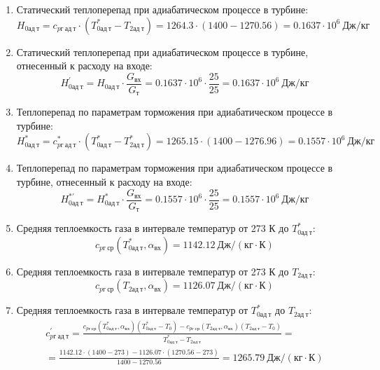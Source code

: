 \documentclass[a4paper,10pt]{article}
\begin{document}
\begin{enumerate}
        \item Статический теплоперепад при адиабатическом процессе в турбине:
        \[
            H_{0ад\ т} = c_{pг\ ад\ т} \cdot \left(
            T_{0ад\ т}^* - T_{2ад\ т}
            \right) =
            1264.3 \cdot \left(
            1400 - 1270.56
            \right) =
            0.1637 \cdot 10^6 \ Дж/кг
        \]

        \item Статический теплоперепад при адиабатическом процессе в турбине, отнесенный к расходу на входе:
        \[
            H_{0ад\ т}^\prime = H_{0ад\ т} \cdot \frac{ G_{вх} }{ G_т }  =
                0.1637 \cdot 10^6 \cdot
                \frac{ 25 }{ 25 } =
            0.1637 \cdot 10^6 \ Дж/кг
        \]

        \item Теплоперепад по параметрам торможения при адиабатическом процессе в турбине:
        \[
            H_{0ад\ т}^* = c_{pг\ ад\ т}^* \cdot \left(
            T_{0ад\ т}^* - T_{2ад\ т}^*
            \right) =
            1265.15 \cdot \left(
            1400 - 1276.96
            \right) =
            0.1557 \cdot 10^6 \ Дж/кг
        \]

        \item Теплоперепад по параметрам торможения при адиабатическом процессе в турбине, отнесенный к расходу на входе:
        \[
            H_{0ад\ т}^{*\prime} = H_{0ад\ т}^* \cdot \frac{ G_{вх} }{ G_т }  =
                0.1557 \cdot 10^6 \cdot
                \frac{ 25 }{ 25 } =
            0.1557 \cdot 10^6 \ Дж/кг
        \]

        \item Средняя теплоемкость газа в интервале температур от 273 К до $T_{0ад\ т}^*$:
        \[
            c_{pг\ ср} (T_{0ад\ т}^*, \alpha_{вх}) =
            1142.12 \ Дж/(кг \cdot К)
        \]

        \item Средняя теплоемкость газа в интервале температур от 273 К до $T_{2ад\ т}$:
        \[
            c_{pг\ ср} (T_{2ад\ т}, \alpha_{вх}) =
            1126.07 \ Дж/(кг \cdot К)
        \]

        \item Средняя теплоемкость газа в интервале температур от $T_{0ад\ т}^*$ до $T_{2ад\ т}$:
        \begin{gather*}
            c_{pг\ ад\ т}^\prime = \frac{
		        c_{pг\ ср} (T_{0ад\ т}^*, \alpha_{вх}) (T_{0ад\ т}^* - T_0) - c_{pг\ ср} (T_{2ад\ т}, \alpha_{вх})(T_{2ад\ т} - T_0)
		    }{
		        T_{0ад\ т}^* - T_{2ад\ т}} =\\
            =\frac{
		        1142.12 \cdot
                (1400 - 273) -
		        1126.07 \cdot
                (1270.56 - 273)
		    }{
		        1400 - 1270.56} =
		    1265.79 \ Дж / (кг \cdot К)\\
        \end{gather*}


\end{enumerate}
\end{document}
